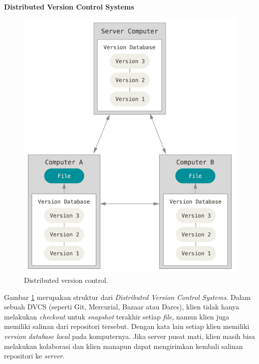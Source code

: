 \documentclass[a4paper,twoside]{article}
\begin{document}
\begin{enumerate}
\textbf{Distributed Version Control Systems}\\
\begin{figure}[H]
	\centering
		\includegraphics[scale=0.5]{Gambar/dvcs.png}
	\caption{Distributed version control\cite{chacon2014pro}.}
	\label{fig:dvcs}
\end{figure}
Gambar \ref{fig:dvcs} merupakan struktur dari \textit{Distributed Version Control Systems}. Dalam sebuah DVCS (seperti Git, Mercurial, Bazaar atau Darcs), klien tidak hanya melakukan \textit{checkout} untuk \textit{snapshot} terakhir setiap \textit{file}, namun klien juga memiliki salinan dari repositori tersebut. Dengan kata lain setiap klien memiliki \textit{version database local} pada komputernya. Jika server pusat mati, klien masih bisa melakukan kolaborasi dan klien manapun dapat mengirimkan kembali salinan repositori ke \textit{server}.


\end{enumerate}
\end{document}
